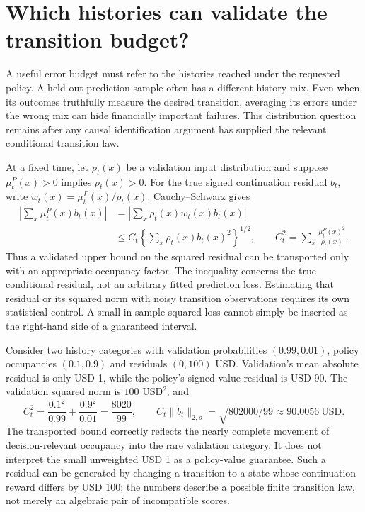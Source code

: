 \section{Which histories can validate the transition budget?}
\label{exec17:s5-transport}

A useful error budget must refer to the histories reached under the requested
policy. A held-out prediction sample often has a different history mix.
Even when its outcomes truthfully measure the desired transition, averaging
its errors under the wrong mix can hide financially important failures.
This distribution question remains after any causal identification argument
has supplied the relevant conditional transition law.

At a fixed time, let $\rho_t(x)$ be a validation input distribution and suppose
$\mu^P_t(x)>0$ implies $\rho_t(x)>0$. For the true signed continuation
residual $b_t$, write $w_t(x)=\mu^P_t(x)/\rho_t(x)$. Cauchy--Schwarz gives
\begin{equation}
 \begin{split}
 \left|\sum_x\mu^P_t(x)b_t(x)\right|
 &=\left|\sum_x\rho_t(x)w_t(x)b_t(x)\right|\\
 &\leq C_t\left\{\sum_x\rho_t(x)b_t(x)^2\right\}^{1/2},\qquad
 C_t^2=\sum_x\frac{\mu^P_t(x)^2}{\rho_t(x)}.
 \end{split}
 \label{exec17:s5-transport-bound}
\end{equation}
Thus a validated upper bound on the squared residual can be transported only
with an appropriate occupancy factor. The inequality concerns the true
conditional residual, not an arbitrary fitted prediction loss. Estimating
that residual or its squared norm with noisy transition observations requires
its own statistical control. A small in-sample squared loss cannot simply be
inserted as the right-hand side of a guaranteed interval.

Consider two history categories with validation probabilities $(0.99,0.01)$,
policy occupancies $(0.1,0.9)$ and residuals $(0,100)$ USD. Validation's mean
absolute residual is only USD 1, while the policy's signed value residual is
USD 90. The validation squared norm is $100$ USD$^2$, and
\begin{equation}
 C_t^2=\frac{0.1^2}{0.99}+\frac{0.9^2}{0.01}
      =\frac{8020}{99},\qquad
 C_t\|b_t\|_{2,\rho}=\sqrt{802000/99}\approx90.0056\ \mathrm{USD}.
 \label{exec17:s5-transport-example}
\end{equation}
The transported bound correctly reflects the nearly complete movement of
decision-relevant occupancy into the rare validation category. It does not
interpret the small unweighted USD 1 as a policy-value guarantee. Such a
residual can be generated by changing a transition to a state whose
continuation reward differs by USD 100; the numbers describe a possible
finite transition law, not merely an algebraic pair of incompatible scores.

